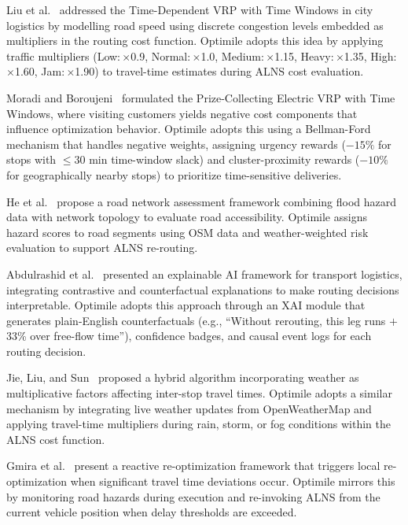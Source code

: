 \documentclass[conference]{IEEEtran}
\begin{document}
Liu et al.~\citep{liu_time-dependent_2020} addressed the Time-Dependent VRP
with Time Windows in city logistics by modelling road speed using discrete
congestion levels embedded as multipliers in the routing cost function.
Optimile adopts this idea by applying traffic multipliers
(Low:\,$\times$0.9, Normal:\,$\times$1.0, Medium:\,$\times$1.15,
Heavy:\,$\times$1.35, High:\,$\times$1.60, Jam:\,$\times$1.90)
to travel-time estimates during ALNS cost evaluation.

Moradi and Boroujeni~\citep{moradi_prize-collecting_2025} formulated the
Prize-Collecting Electric VRP with Time Windows, where visiting customers
yields negative cost components that influence optimization behavior.
Optimile adopts this using a Bellman-Ford mechanism that handles negative
weights, assigning urgency rewards ($-15\%$ for stops with $\leq$30 min
time-window slack) and cluster-proximity rewards ($-10\%$ for geographically
nearby stops) to prioritize time-sensitive deliveries.

He et al.~\citep{he_functionality_2024} propose a road network assessment
framework combining flood hazard data with network topology to evaluate road
accessibility. Optimile assigns hazard scores to road segments using OSM
data and weather-weighted risk evaluation to support ALNS re-routing.

Abdulrashid et al.~\citep{abdulrashid_explainable_2024} presented an
explainable AI framework for transport logistics, integrating contrastive
and counterfactual explanations to make routing decisions interpretable.
Optimile adopts this approach through an XAI module that generates
plain-English counterfactuals (e.g., ``Without rerouting, this leg runs
$+$33\% over free-flow time''), confidence badges, and causal event logs for
each routing decision.

Jie, Liu, and Sun~\citep{jie_hybrid_2022} proposed a hybrid algorithm
incorporating weather as multiplicative factors affecting inter-stop travel
times. Optimile adopts a similar mechanism by integrating live weather
updates from OpenWeatherMap and applying travel-time multipliers during
rain, storm, or fog conditions within the ALNS cost function.

Gmira et al.~\citep{gmira_managing_2021} present a reactive re-optimization
framework that triggers local re-optimization when significant travel time
deviations occur. Optimile mirrors this by monitoring road hazards during
execution and re-invoking ALNS from the current vehicle position when delay
thresholds are exceeded.
\end{document}
